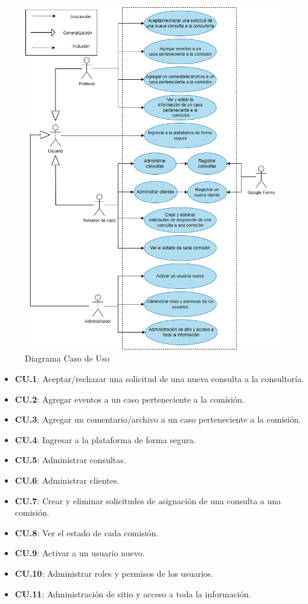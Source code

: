 \begin{figure}[H]
\centering
\includegraphics[width=1\linewidth]{fig/caso-de-uso.png}
\caption{Diagrama Caso de Uso}
\label{fig:caso-de-uso}
\end{figure}

\begin{itemize}
\item \textbf{CU.1}: Aceptar/rechazar una solicitud de una nueva consulta a la consultoría.
\item \textbf{CU.2}: Agregar eventos a un caso perteneciente a la comisión.
\item \textbf{CU.3}: Agregar un comentario/archivo a un caso perteneciente a la comisión.
\item \textbf{CU.4}: Ingresar a la plataforma de forma segura.
\item \textbf{CU.5}: Administrar consultas.
\item \textbf{CU.6}: Administrar clientes.
\item \textbf{CU.7}: Crear y eliminar solicitudes de asignación de una consulta a una comisión.
\item \textbf{CU.8}: Ver el estado de cada comisión.
\item \textbf{CU.9}: Activar a un usuario nuevo.
\item \textbf{CU.10}: Administrar roles y permisos de los usuarios.
\item \textbf{CU.11}: Administración de sitio y acceso a toda la información.
\end{itemize}


